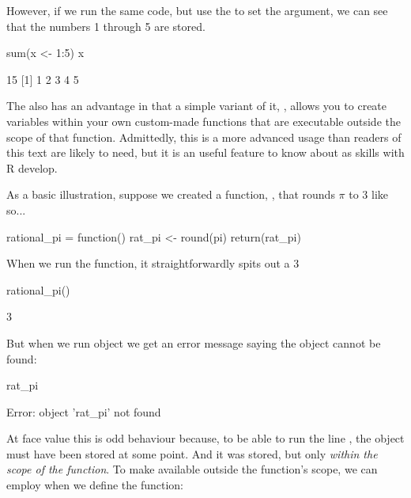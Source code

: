 \noindent
However, if we run the same code, but use the \R{<-} to set the argument, we can see that the numbers 1 through 5 are stored.

\begin{inR}
sum(x <- 1:5)
x
\end{inR}

\begin{outR}
[1] 15
[1] 1 2 3 4 5
\end{outR}

The \R{<-} also has an advantage in that a simple variant of it, \R{{<}<-}, allows you to create variables within your own custom-made functions that are executable outside the scope of that function. Admittedly, this is a more advanced usage than readers of this text are likely to need, but it is an useful feature to know about as skills with R develop.

As a basic illustration, suppose we created a function, , that rounds $\pi$ to 3 like so...

\begin{inR}
rational_pi = function() {
  rat_pi <- round(pi)
  return(rat_pi)
}
\end{inR}

\medskip

\noindent
When we run the function, it straightforwardly spits out a 3

\begin{inR}
rational_pi()
\end{inR}

\begin{outR}
[1] 3
\end{outR}

\noindent
But when we run object  we get an error message saying the object cannot be found:

\begin{inR}
rat_pi
\end{inR}

\begin{outR}
Error: object 'rat_pi' not found
\end{outR}

\noindent
At face value this is odd behaviour because, to be able to run the line , the object  must have been stored at some point.  And it was stored, but only \textit{within the scope of the function}. To make  available outside the function's scope, we can employ \R{{<}<-} when we define the function:

\clearpage

